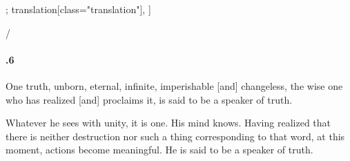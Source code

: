 \begin{alignment}[
  texts=edition[class="edition"];
  translation[class="translation"],
  ]
\begin{edition}
\begin{tlg}[44_10]
{
/}\\
\end{tlg} 
  \end{edition}
  \begin{translation}
    \begin{tlate}[44_6]
      \noindent
      \paragraph{.6} One truth, unborn, eternal, infinite, imperishable [and] changeless, the wise one who has realized [and] proclaims it, is said to be a speaker of truth. \\
    \end{tlate}
    \begin{tlate}[p44_03]
      Whatever he sees with unity, it is one. His mind knows. Having realized that there is neither destruction nor such a thing corresponding to that word, at this moment, actions become meaningful. He is said to be a speaker of truth.
    \end{tlate}
    \begin{tlate}[44_7]

\end{tlate}
\end{translation}
\end{alignment}

